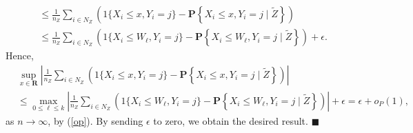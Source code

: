 \documentclass[12pt, fullpage]{amsart}
\theoremstyle{definition}
\theoremstyle{definition}
\theoremstyle{definition}
\begin{document}
\begin{bibunit}[econometrica]
\begin{align*}
	&\le \frac{1}{n_Z} \sum_{i \in N_Z} \left( 1\{X_i \le x, Y_i = j\} - \mathbf{P}\left\{X_i \le x, Y_i = j \mid \tilde Z\right\} \right) \\
	&\le \frac{1}{n_Z} \sum_{i \in N_Z} \left( 1\{X_i \le W_{\ell}, Y_i = j\} - \mathbf{P}\left\{X_i \le W_{\ell}, Y_i = j \mid \tilde Z\right\} \right) + \epsilon.
\end{align*}
Hence,
\begin{align*}
	&\sup_{x \in \mathbf{R}} \left| \frac{1}{n_Z} \sum_{i \in N_Z}  \left( 1\{X_i \le x, Y_i = j\} - \mathbf{P}\left\{X_i \le x, Y_i = j \mid \tilde Z\right\} \right) \right|\\
	&\le  \max_{0 \le \ell \le k} \left| \frac{1}{n_Z} \sum_{i \in N_Z}  \left( 1\{X_i \le W_{\ell}, Y_i = j\} - \mathbf{P}\left\{X_i \le W_{\ell}, Y_i = j \mid \tilde Z\right\} \right)\right| + \epsilon = \epsilon+o_P(1),
\end{align*}
as $n \rightarrow \infty$, by (\ref{op}). By sending $\epsilon$ to zero, we obtain the desired result. $\blacksquare$\medskip


\end{bibunit}
\end{document}
